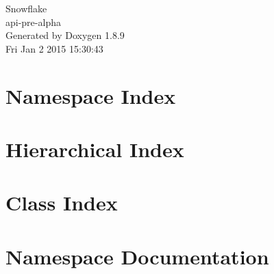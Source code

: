 \documentclass[twoside]{book}
\newcommand{\+}{\discretionary{\mbox{\scriptsize$\hookleftarrow$}}{}{}}
\newcommand{\clearemptydoublepage}{%
  \newpage{\pagestyle{empty}\cleardoublepage}%
}
\begin{document}
\hypersetup{pageanchor=false,
             bookmarks=true,
             bookmarksnumbered=true,
             pdfencoding=unicode
            }
\begin{titlepage}
\vspace*{7cm}
\begin{center}%
{\Large Snowflake \\[1ex]\large api-\/pre-\/alpha }\\
\vspace*{1cm}
{\large Generated by Doxygen 1.8.9}\\
\vspace*{0.5cm}
{\small Fri Jan 2 2015 15:30:43}\\
\end{center}
\end{titlepage}
\clearemptydoublepage
\tableofcontents
\clearemptydoublepage
{}
\hypersetup{pageanchor=true}

\chapter{Namespace Index}

\chapter{Hierarchical Index}

\chapter{Class Index}

\chapter{Namespace Documentation}






















\end{document}
